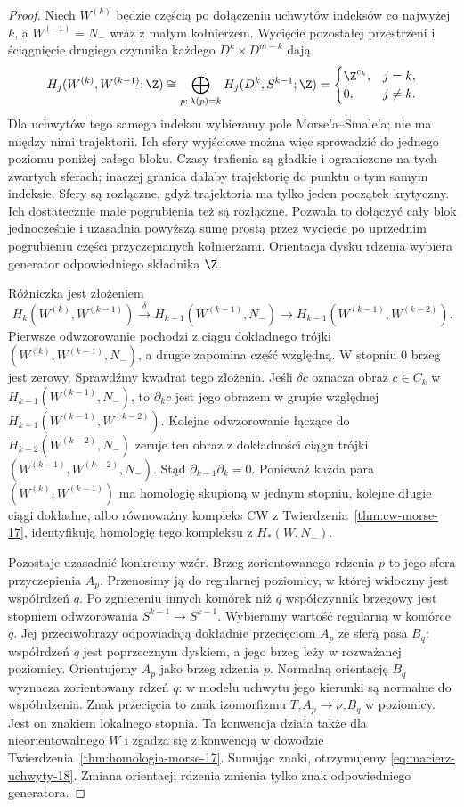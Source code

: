\begin{proof}
Niech $W^{(k)}$ będzie częścią po dołączeniu
uchwytów indeksów co najwyżej $k$,
a $W^{(-1)}=N_-$ wraz z małym kołnierzem.
Wycięcie pozostałej przestrzeni i
ściągnięcie drugiego czynnika każdego
$D^k\times D^{m-k}$ dają
\[
 H_j(W^{(k)},W^{(k-1)};\Z)
 \cong
 \bigoplus_{p:\,\lambda(p)=k}
 H_j(D^k,S^{k-1};\Z)
 =
 \begin{cases}
 \Z^{c_k},&j=k,\\
 0,&j\ne k.
 \end{cases}
\]
Dla uchwytów tego samego indeksu wybieramy pole
Morse'a--Smale'a; nie ma między nimi trajektorii.
Ich sfery wyjściowe można więc sprowadzić do jednego
poziomu poniżej całego bloku. Czasy trafienia są
gładkie i ograniczone na tych zwartych sferach;
inaczej granica dałaby trajektorię do punktu
o tym samym indeksie. Sfery są rozłączne, gdyż
trajektoria ma tylko jeden początek krytyczny.
Ich dostatecznie małe pogrubienia też są rozłączne.
Pozwala to dołączyć cały blok jednocześnie
i uzasadnia powyższą sumę prostą przez wycięcie
po uprzednim pogrubieniu części przyczepianych kołnierzami.
Orientacja dysku rdzenia wybiera generator
odpowiedniego składnika $\Z$.

Różniczka jest złożeniem
\[
 H_k(W^{(k)},W^{(k-1)})
 \xrightarrow{\delta}H_{k-1}(W^{(k-1)},N_-)
 \longrightarrow H_{k-1}(W^{(k-1)},W^{(k-2)}).
\]
Pierwsze odwzorowanie pochodzi z ciągu dokładnego trójki
$(W^{(k)},W^{(k-1)},N_-)$, a drugie zapomina
część względną. W stopniu $0$ brzeg jest zerowy.
Sprawdźmy kwadrat tego złożenia. Jeśli $\delta c$ oznacza
obraz $c\in C_k$ w $H_{k-1}(W^{(k-1)},N_-)$, to
$\partial_k c$ jest jego obrazem w grupie względnej
$H_{k-1}(W^{(k-1)},W^{(k-2)})$. Kolejne odwzorowanie łączące
do $H_{k-2}(W^{(k-2)},N_-)$ zeruje ten obraz z dokładności
ciągu trójki $(W^{(k-1)},W^{(k-2)},N_-)$. Stąd
$\partial_{k-1}\partial_k=0$. Ponieważ każda para
$(W^{(k)},W^{(k-1)})$ ma homologię
skupioną w jednym stopniu, kolejne
długie ciągi dokładne, albo równoważny
kompleks CW z
Twierdzenia~\ref{thm:cw-morse-17},
identyfikują homologię tego kompleksu
z $H_*(W,N_-)$.

Pozostaje uzasadnić konkretny wzór.
Brzeg zorientowanego rdzenia $p$
to jego sfera przyczepienia $A_p$.
Przenosimy ją do regularnej poziomicy,
w której widoczny jest współrdzeń $q$.
Po zgnieceniu innych komórek niż $q$
współczynnik brzegowy jest stopniem
odwzorowania
$S^{k-1}\to S^{k-1}$.
Wybieramy wartość regularną w komórce $q$.
Jej przeciwobrazy odpowiadają dokładnie
przecięciom $A_p$ ze sferą pasa $B_q$:
współrdzeń $q$ jest poprzecznym dyskiem,
a jego brzeg leży w rozważanej poziomicy.
Orientujemy $A_p$ jako brzeg rdzenia $p$.
Normalną orientację $B_q$ wyznacza zorientowany
rdzeń $q$: w modelu uchwytu jego kierunki są
normalne do współrdzenia. Znak przecięcia to znak
izomorfizmu $T_zA_p\to\nu_z B_q$ w poziomicy.
Jest on znakiem lokalnego stopnia. Ta konwencja
działa także dla nieorientowalnego $W$ i zgadza się
z konwencją w dowodzie
Twierdzenia~\ref{thm:homologia-morse-17}.
Sumując znaki, otrzymujemy
\eqref{eq:macierz-uchwyty-18}.
Zmiana orientacji rdzenia zmienia tylko
znak odpowiedniego generatora.
\end{proof}

